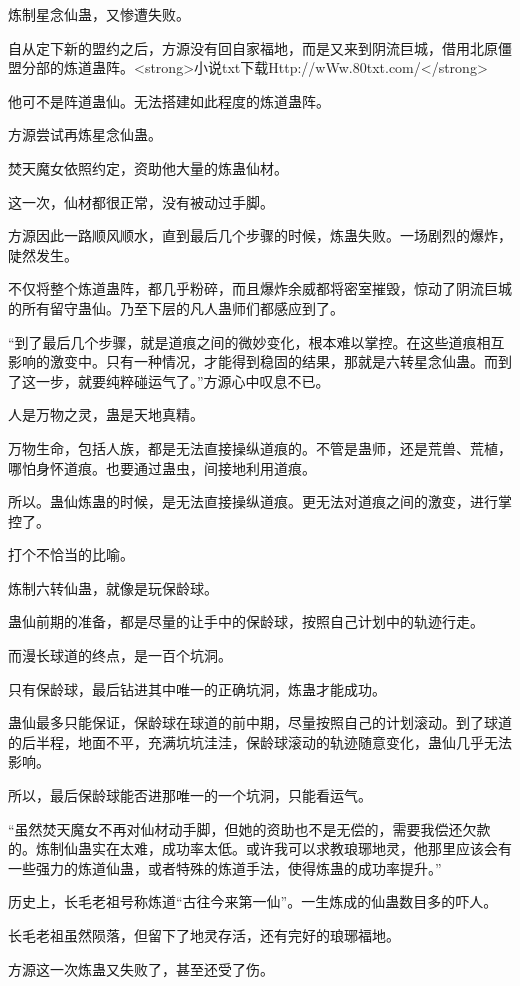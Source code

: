 \begin{this_body}
炼制星念仙蛊，又惨遭失败。

自从定下新的盟约之后，方源没有回自家福地，而是又来到阴流巨城，借用北原僵盟分部的炼道蛊阵。<strong>小说txt下载Http://wWw.80txt.com/</strong>

他可不是阵道蛊仙。无法搭建如此程度的炼道蛊阵。

方源尝试再炼星念仙蛊。

焚天魔女依照约定，资助他大量的炼蛊仙材。

这一次，仙材都很正常，没有被动过手脚。

方源因此一路顺风顺水，直到最后几个步骤的时候，炼蛊失败。一场剧烈的爆炸，陡然发生。

不仅将整个炼道蛊阵，都几乎粉碎，而且爆炸余威都将密室摧毁，惊动了阴流巨城的所有留守蛊仙。乃至下层的凡人蛊师们都感应到了。

“到了最后几个步骤，就是道痕之间的微妙变化，根本难以掌控。在这些道痕相互影响的激变中。只有一种情况，才能得到稳固的结果，那就是六转星念仙蛊。而到了这一步，就要纯粹碰运气了。”方源心中叹息不已。

人是万物之灵，蛊是天地真精。

万物生命，包括人族，都是无法直接操纵道痕的。不管是蛊师，还是荒兽、荒植，哪怕身怀道痕。也要通过蛊虫，间接地利用道痕。

所以。蛊仙炼蛊的时候，是无法直接操纵道痕。更无法对道痕之间的激变，进行掌控了。

打个不恰当的比喻。

炼制六转仙蛊，就像是玩保龄球。

蛊仙前期的准备，都是尽量的让手中的保龄球，按照自己计划中的轨迹行走。

而漫长球道的终点，是一百个坑洞。

只有保龄球，最后钻进其中唯一的正确坑洞，炼蛊才能成功。

蛊仙最多只能保证，保龄球在球道的前中期，尽量按照自己的计划滚动。到了球道的后半程，地面不平，充满坑坑洼洼，保龄球滚动的轨迹随意变化，蛊仙几乎无法影响。

所以，最后保龄球能否进那唯一的一个坑洞，只能看运气。

“虽然焚天魔女不再对仙材动手脚，但她的资助也不是无偿的，需要我偿还欠款的。炼制仙蛊实在太难，成功率太低。或许我可以求教琅琊地灵，他那里应该会有一些强力的炼道仙蛊，或者特殊的炼道手法，使得炼蛊的成功率提升。”

历史上，长毛老祖号称炼道“古往今来第一仙”。一生炼成的仙蛊数目多的吓人。

长毛老祖虽然陨落，但留下了地灵存活，还有完好的琅琊福地。

方源这一次炼蛊又失败了，甚至还受了伤。


\end{this_body}
